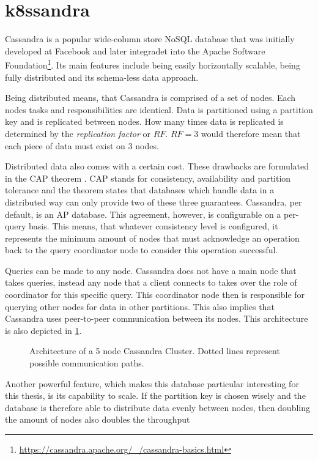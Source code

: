 \section{k8ssandra}
\label{sec:k8ssandra}

Cassandra is a popular wide-column store NoSQL database that was initially developed at Facebook and later integradet into the Apache Software Foundation\footnote{\url{https://cassandra.apache.org/_/cassandra-basics.html}\label{fn:cassandra-basics}}. Its main features include being easily horizontally scalable, being fully distributed and its schema-less data approach.

Being distributed means, that Cassandra is comprised of a set of nodes. Each nodes tasks and responsibilities are identical. Data is partitioned using a partition key and is replicated between nodes. How many times data is replicated is determined by the \textit{replication factor} or \(RF\). \(RF = 3\) would therefore mean that each piece of data must exist on 3 nodes.

Distributed data also comes with a certain cost. These drawbacks are formulated in the CAP theorem \cite{foxHarvestYieldScalable1999a}. CAP stands for consistency, availability and partition tolerance and the theorem states that databases which handle data in a distributed way can only provide two of these three guarantees. Cassandra, per default, is an AP database. This agreement, however, is configurable on a per-query basis. This means, that whatever consistency level is configured, it represents the minimum amount of nodes that must acknowledge an operation back to the query coordinator node to consider this operation successful.

Queries can be made to any node. Cassandra does not have a main node that takes queries, instead any node that a client connects to takes over the role of coordinator for this specific query. This coordinator node then is responsible for querying other nodes for data in other partitions. This also implies that Cassandra uses peer-to-peer communication between its nodes. This architecture is also depicted in \cref{fig:cassandra-architecture}.

\begin{figure}
    \centering
    \caption{Architecture of a 5 node Cassandra Cluster. Dotted lines represent possible communication paths.}
    \label{fig:cassandra-architecture}
\end{figure}

Another powerful feature, which makes this database particular interesting for this thesis, is its capability to scale. If the partition key is chosen wisely and the database is therefore able to distribute data evenly between nodes, then doubling the amount of nodes also doubles the throughput 

